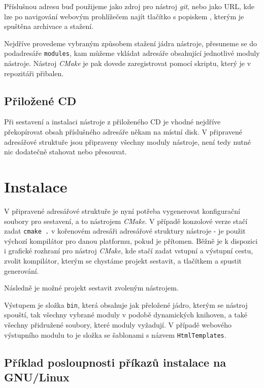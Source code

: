 \documentclass[czech,BP]{thesiskiv}
\begin{document}
Příslušnou adresu buď použijeme jako zdroj pro nástroj \emph{git}, nebo jako URL, kde lze po navigování webovým prohlížečem najít tlačítko s popiskem , kterým je spuštěna archivace a stažení.

Nejdříve provedeme vybraným způsobem stažení jádra nástroje, přesuneme se do podadresáře \texttt{modules}, kam můžeme vkládat adresáře obsahující jednotlivé moduly nástroje. Nástroj \emph{CMake} je pak dovede zaregistrovat pomocí skriptu, který je v repozitáři přibalen.

\subsection*{Přiložené CD}

Při sestavení a instalaci nástroje z přiloženého CD je vhodné nejdříve překopírovat obsah příslušného adresáře někam na místní disk. V připravené adresářové struktuře jsou připraveny všechny moduly nástroje, není tedy nutné nic dodatečně stahovat nebo přesouvat.

\section{Instalace}

V připravené adresářové struktuře je nyní potřeba vygenerovat konfigurační soubory pro sestavení, a to nástrojem \emph{CMake}. V případě konzolové verze stačí zadat \texttt{cmake .} v kořenovém adresáři adresářové struktury nástroje - je použit výchozí kompilátor pro danou platformu, pokud je přítomen. Běžně je k dispozici i grafické rozhraní pro nástroj \emph{CMake}, kde stačí zadat vstupní a výstupní cestu, zvolit kompilátor, kterým se chystáme projekt sestavit, a tlačítkem  a  spustit generování.

Následně je možné projekt sestavit zvoleným nástrojem.

Výstupem je složka \texttt{bin}, která obsahuje jak přeložené jádro, kterým se nástroj spouští, tak všechny vybrané moduly v podobě dynamických knihoven, a také všechny přidružené soubory, které moduly vyžadují. V případě webového výstupního modulu to je složka se šablonami s názvem \texttt{HtmlTemplates}.

\subsection*{Příklad posloupnosti příkazů instalace na GNU/Linux}
\end{document}
